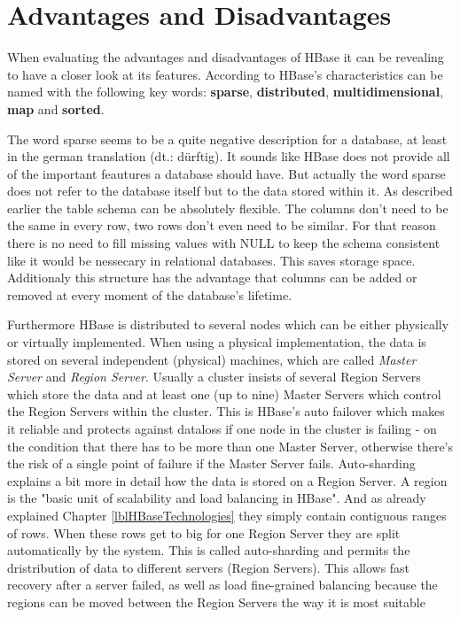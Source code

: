 
\chapter{Advantages and Disadvantages}
When evaluating the advantages and disadvantages of HBase it can be revealing to have a closer look at its features. According to \cite{hbase.achari.2015} HBase's characteristics can be named with the following key words: \textbf{sparse}, \textbf{distributed}, \textbf{multidimensional}, \textbf{map} and \textbf{sorted}. 

The word sparse seems to be a quite negative description for a database, at least in the german translation (dt.: dürftig). It sounds like HBase does not provide all of the important feautures a database should have. But actually the word sparse does not refer to the database itself but to the data stored within it. As described earlier the table schema can be absolutely flexible. The columns don't need to be the same in every row, two rows don't even need to be similar. For that reason there is no need to fill missing values with NULL to keep the schema consistent like it would be nessecary in relational databases. This saves storage space. Additionaly this structure has the advantage that columns can be added or removed at every moment of the database's lifetime. \cite{hbase.achari.2015}

Furthermore HBase is distributed to several nodes which can be either physically or virtually implemented. When using a physical implementation, the data is stored on several independent (physical) machines, \cite{hbase.wilson.2008} which are called \textit{Master Server} and \textit{Region Server}. Usually a cluster insists of several Region Servers which store the data \cite{hbase.vohra.2016} and at least one (up to nine) Master Servers which control the Region Servers within the cluster. \cite{hbase.apache.foundation.2017} This is HBase's auto failover which makes it reliable and protects against dataloss if one node in the cluster is failing \cite{hbase.wilson.2008} - on the condition that there has to be more than one Master Server, otherwise there’s the risk of a single point of failure if the Master Server fails. \cite{hbase.shriparv.2014}
Auto-sharding explains a bit more in detail how the data is stored on a Region Server. A region is the "basic unit of scalability and load balancing in HBase". And as already explained Chapter \ref{lblHBaseTechnologies} they simply contain contiguous ranges of rows. When these rows get to big for one Region Server they are split automatically by the system. This is called auto-sharding and permits the dristribution of data to different servers (Region Servers). This allows fast recovery after a server failed, as well as load fine-grained balancing because the regions can be moved between the Region Servers the way it is most suitable \cite{hbase.george.2011}

